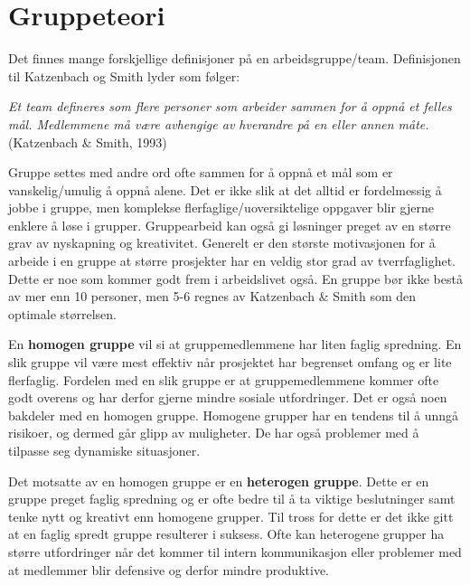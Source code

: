 \section{Gruppeteori}
Det finnes mange forskjellige definisjoner på en arbeidsgruppe/team. 
Definisjonen til Katzenbach og Smith lyder som følger:

\begin{center}
\textit{Et team defineres som flere personer som arbeider sammen for å oppnå et felles mål. 
Medlemmene må være avhengige av hverandre på en eller annen måte.}
\newline 
(Katzenbach \& Smith, 1993)
\end{center}

Gruppe settes med andre ord ofte sammen for å oppnå et mål som er vanskelig/umulig å oppnå alene. 
Det er ikke slik at det alltid er fordelmessig å jobbe i gruppe, men komplekse flerfaglige/uoversiktelige oppgaver blir gjerne enklere å løse i grupper.
Gruppearbeid kan også gi løsninger preget av en større grav av nyskapning og kreativitet. 
Generelt er den største motivasjonen for å arbeide i en gruppe at større prosjekter har en veldig stor grad av tverrfaglighet. 
Dette er noe som kommer godt frem i arbeidslivet også. 
En gruppe bør ikke bestå av mer enn 10 personer, men 5-6 regnes av Katzenbach \& Smith som den optimale størrelsen.
\vspace{\secspace}

En \textbf{homogen gruppe} vil si at gruppemedlemmene har liten faglig spredning. 
En slik gruppe vil være mest effektiv når prosjektet har begrenset omfang og er lite flerfaglig. 
Fordelen med en slik gruppe er at gruppemedlemmene kommer ofte godt overens og har derfor gjerne mindre sosiale utfordringer. 
Det er også noen bakdeler med en homogen gruppe. 
Homogene grupper har en tendens til å unngå risikoer, og dermed går glipp av muligheter. 
De har også problemer med å tilpasse seg dynamiske situasjoner.
\vspace{\secspace}

Det motsatte av en homogen gruppe er en \textbf{heterogen gruppe}. 
Dette er en gruppe preget faglig spredning og er ofte bedre til å ta viktige beslutninger samt tenke nytt og kreativt enn homogene grupper. 
Til tross for dette er det ikke gitt at en faglig spredt gruppe resulterer i suksess. 
Ofte kan heterogene grupper ha større utfordringer når det kommer til intern kommunikasjon eller problemer med at medlemmer blir defensive og derfor mindre produktive. 
